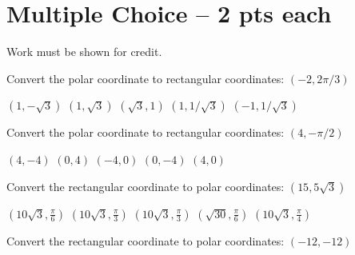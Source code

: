 \documentclass[11pt,answers]{exam}
\begin{document}
\section*{Multiple Choice -- 2 pts each}
{\large Work must be shown for credit.}
\vspace{2ex}
\begin{questions}
	\begin{minipage}{\linewidth}
		\question Convert the polar coordinate to rectangular coordinates: $(-2, 2\pi/3)$

\begin{choices}
	\CorrectChoice $\left(1,-\sqrt{3}\right)$
	\choice $\left(1,\sqrt{3}\right)$
	\choice $\left(\sqrt{3},1\right)$
	\choice $\left(1,1/\sqrt{3}\right)$
	\choice $\left(-1,1/\sqrt{3}\right)$

\end{choices} \answerline
\end{minipage}

\begin{minipage}{\linewidth}
\question Convert the polar coordinate to rectangular coordinates: $(4,-\pi/2)$

\begin{choices}
	\choice $\left(4,-4\right)$
	\choice $\left(0,4\right)$
	\choice $\left(-4,0\right)$
	\CorrectChoice $\left(0,-4\right)$
	\choice $\left(4,0\right)$
\end{choices} \answerline
\end{minipage}

\begin{minipage}{\linewidth}



\question Convert the rectangular coordinate to polar coordinates: $(15, 5\sqrt{3})$

\begin{choices}
	\CorrectChoice $\left(10 \sqrt{3},\frac{\pi }{6}\right)$
	\choice $\left(10 \sqrt{3},\frac{\pi }{3}\right)$
	\choice $\left(10 \sqrt{3},\frac{\pi }{3}\right)$
	\choice $\left(\sqrt{30},\frac{\pi }{6}\right)$
	\choice $\left(10 \sqrt{3},\frac{\pi }{4}\right)$

\end{choices} \answerline
\end{minipage}

\begin{minipage}{\linewidth}



\question Convert the rectangular coordinate to polar coordinates: $(-12, -12)$


\end{minipage}
\end{questions}
\end{document}
